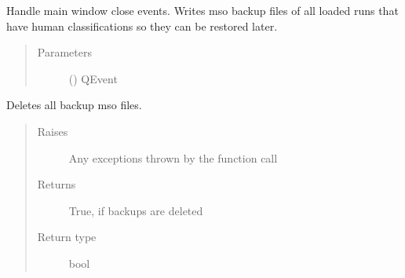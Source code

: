 \documentclass[letterpaper,10pt,english]{sphinxmanual}
\begin{document}
\begin{fulllineitems}
\begin{fulllineitems}
\end{fulllineitems}


\begin{fulllineitems}
\label{\detokenize{polo.windows:polo.windows.main_window.MainWindow.closeEvent}}
Handle main window close events. Writes mso backup files of
all loaded runs that have human classifications so they can be
restored later.
\begin{quote}\begin{description}
\item[{Parameters}] \leavevmode
{} () \textendash{} QEvent

\end{description}\end{quote}

\end{fulllineitems}


\begin{fulllineitems}
\label{\detokenize{polo.windows:polo.windows.main_window.MainWindow.delete_all_backups}}
Deletes all backup mso files.
\begin{quote}\begin{description}
\item[{Raises}] \leavevmode
{} \textendash{} Any exceptions thrown by the function call

\item[{Returns}] \leavevmode
True, if backups are deleted

\item[{Return type}] \leavevmode
bool

\end{description}\end{quote}

\end{fulllineitems}


\end{fulllineitems}
\end{document}
